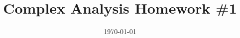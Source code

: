 \documentclass{article}
\date{\today}
\title{Complex Analysis Homework \#1}
\begin{document}
\maketitle

\begin{prob}
\end{prob}
\end{document}
